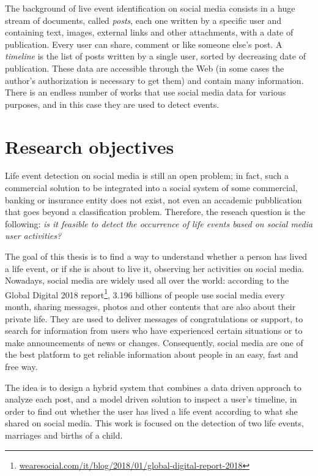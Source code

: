 The background of live event identification on social media consists in a huge stream of documents, called \emph{posts}, each one written by a specific user and containing text, images, external links and other attachments, with a date of publication. Every user can share, comment or like someone else's post. A \emph{timeline} is the list of posts written by a single user, sorted by decreasing date of publication. These data are accessible through the Web (in some cases the author's authorization is necessary to get them) and contain many information. There is an endless number of works that use social media data for various purposes, and in this case they are used to detect events.

\section{Research objectives}
Life event detection on social media is still an open problem; in fact, such a commercial solution to be integrated into a social system of some commercial, banking or insurance entity does not exist, not even an accademic pubblication that goes beyond a classification problem. Therefore, the reseach question is the following: \emph{is it feasible to detect the occurrence of life events based on social media user activities?}

The goal of this thesis is to find a way to understand whether a person has lived a life event, or if she is about to live it, observing her activities on social media. Nowadays, social media are widely used all over the world: according to the Global Digital 2018 report\footnote{\url{wearesocial.com/it/blog/2018/01/global-digital-report-2018}}, 3.196 billions of people use social media every month, sharing messages, photos and other contents that are also about their private life. They are used to deliver messages of congratulations or support, to search for information from users who have experienced certain situations or to make announcements of news or changes. Consequently, social media are one of the best platform to get reliable information about people in an easy, fast and free way.

The idea is to design a hybrid system that combines a data driven approach to analyze each post, and a model driven solution to inspect a user's timeline, in order to find out whether the user has lived a life event according to what she shared on social media. This work is focused on the detection of two life events, marriages and births of a child.

